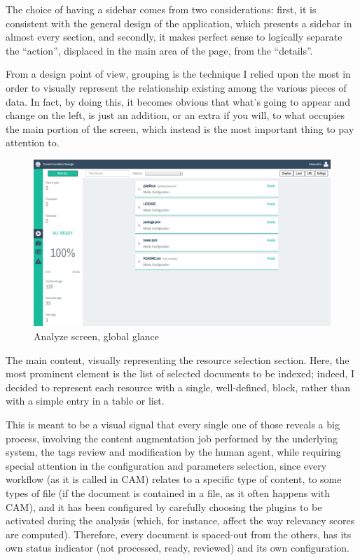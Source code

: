 \documentclass[12pt,oneside,svgnames]{memoir}
\begin{document}
The choice of having a sidebar comes from two considerations: first, it
is consistent with the general design of the application, which presents
a sidebar in almost every section, and secondly, it makes perfect sense
to logically separate the ``action'', displaced in the main area of the
page, from the ``details''.

From a design point of view, grouping is the technique I relied upon the
most in order to visually represent the relationship existing among the
various pieces of data. In fact, by doing this, it becomes obvious that
what's going to appear and change on the left, is just an addition, or
an extra if you will, to what occupies the main portion of the screen,
which instead is the most important thing to pay attention to.

\begin{figure}[htbp]
\centering
\includegraphics{./src/img/analyze-screen.png}
\caption{Analyze screen, global glance}
\end{figure}

The main content, visually representing the resource selection section.
Here, the most prominent element is the list of selected documents to be
indexed; indeed, I decided to represent each resource with a single,
well-defined, block, rather than with a simple entry in a table or list.

This is meant to be a visual signal that every single one of those
reveals a big process, involving the content augmentation job performed
by the underlying system, the tags review and modification by the human
agent, while requiring special attention in the configuration and
parameters selection, since every workflow (as it is called in CAM)
relates to a specific type of content, to some types of file (if the
document is contained in a file, as it often happens with CAM), and it
has been configured by carefully choosing the plugins to be activated
during the analysis (which, for instance, affect the way relevancy
scores are computed). Therefore, every document is spaced-out from the
others, has its own status indicator (not processed, ready, reviewed)
and its own configuration.
\end{document}
